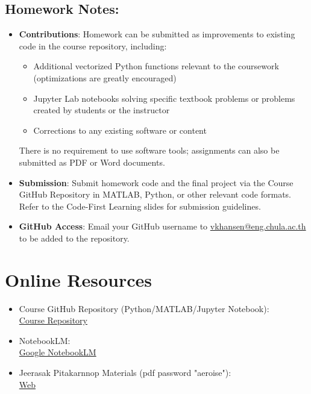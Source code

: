 \documentclass[12pt]{article}
\begin{document}
\subsection*{Homework Notes:}
\begin{itemize}
    \item \textbf{Contributions}: Homework can be submitted as improvements to existing code in the course repository, including:
    \begin{itemize}
        \item Additional vectorized Python functions relevant to the coursework (optimizations are greatly encouraged)
        \item Jupyter Lab notebooks solving specific textbook problems or problems created by students or the instructor
        \item Corrections to any existing software or content
    \end{itemize}
    There is no requirement to use software tools; assignments can also be submitted as PDF or Word documents.
    \item \textbf{Submission}: Submit homework code and the final project via the Course GitHub Repository in MATLAB, Python, or other relevant code formats. Refer to the Code-First Learning slides for submission guidelines.
    \item \textbf{GitHub Access}: Email your GitHub username to \href{mailto:vkhansen@eng.chula.ac.th}{vkhansen@eng.chula.ac.th} to be added to the repository.
\end{itemize}

\section*{Online Resources}
\begin{itemize}
    \item Course GitHub Repository (Python/MATLAB/Jupyter Notebook):\\
    \href{https://github.com/vkhansen/rocket_propulsion.git}{Course Repository}
    \item NotebookLM:\\
    \href{https://notebooklm.google.com/notebook/c7f10837-5c21-46ee-af09-273d38bb41a3}{Google NotebookLM}
    \item Jeerasak Pitakarnnop Materials (pdf password "aeroise"):\\
    \href{https://pitakarnnop.wordpress.com/engineering-courses/rocket-propulsion}{Web}
\end{itemize}
\end{document}
